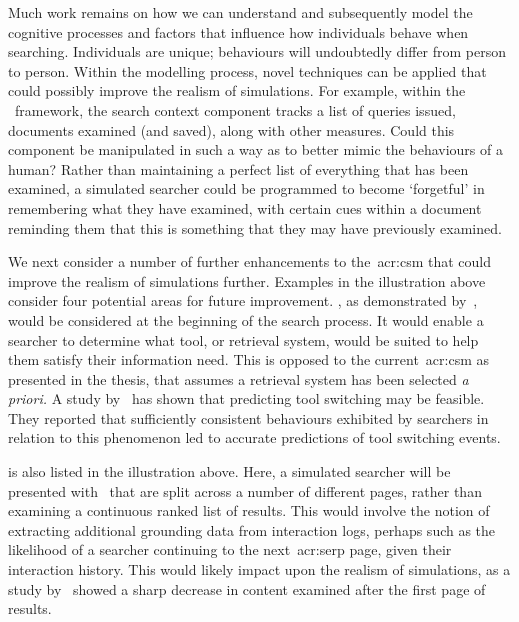 Much work remains on how we can understand and subsequently model the cognitive processes and factors that influence how individuals behave when searching. Individuals are unique; behaviours will undoubtedly differ from person to person. Within the modelling process, novel techniques can be applied that could possibly improve the realism of simulations. For example, within the \simiir~framework, the search context component tracks a list of queries issued, documents examined (and saved), along with other measures. Could this component be manipulated in such a way as to better mimic the behaviours of a human? Rather than maintaining a perfect list of everything that has been examined, a simulated searcher could be programmed to become `forgetful' in remembering what they have examined, with certain cues within a document reminding them that this is something that they may have previously examined.

We next consider a number of further enhancements to the~\gls{acr:csm} that could improve the realism of simulations further. Examples in the illustration above consider four potential areas for future improvement. , as demonstrated by~\cite{thomas2014modelling_behaviour}, would be considered at the beginning of the search process. It would enable a searcher to determine what tool, or retrieval system, would be suited to help them satisfy their information need. This is opposed to the current~\gls{acr:csm} as presented in the thesis, that assumes a retrieval system has been selected \emph{a priori.} A study by~\cite{white2009tool_switching} has shown that predicting tool switching may be feasible. They reported that sufficiently consistent behaviours exhibited by searchers in relation to this phenomenon led to accurate predictions of tool switching events.

 is also listed in the illustration above. Here, a simulated searcher will be presented with~ that are split across a number of different pages, rather than examining a continuous ranked list of results. This would involve the notion of extracting additional grounding data from interaction logs, perhaps such as the likelihood of a searcher continuing to the next~\gls{acr:serp} page, given their interaction history. This would likely impact upon the realism of simulations, as a study by~\cite{jansen2005analysis} showed a sharp decrease in content examined after the first page of results.

